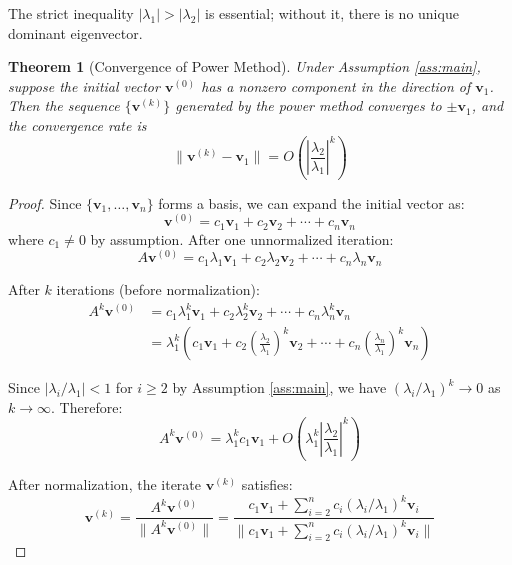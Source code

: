 \documentclass[11pt,a4paper]{article}
\newtheorem{theorem}{Theorem}
\begin{document}
The strict inequality $|\lambda_1| > |\lambda_2|$ is essential; without it, there is no unique dominant eigenvector.

\begin{theorem}[Convergence of Power Method]
\label{thm:convergence}
Under Assumption \ref{ass:main}, suppose the initial vector $\mathbf{v}^{(0)}$ has a nonzero component in the direction of $\mathbf{v}_1$. Then the sequence $\{\mathbf{v}^{(k)}\}$ generated by the power method converges to $\pm \mathbf{v}_1$, and the convergence rate is
\begin{equation}
\|\mathbf{v}^{(k)} - \mathbf{v}_1\| = O\left(\left|\frac{\lambda_2}{\lambda_1}\right|^k\right)
\end{equation}
\end{theorem}

\begin{proof}
Since $\{\mathbf{v}_1, \ldots, \mathbf{v}_n\}$ forms a basis, we can expand the initial vector as:
\begin{equation}
\mathbf{v}^{(0)} = c_1 \mathbf{v}_1 + c_2 \mathbf{v}_2 + \cdots + c_n \mathbf{v}_n
\end{equation}
where $c_1 \neq 0$ by assumption. After one unnormalized iteration:
\begin{equation}
A\mathbf{v}^{(0)} = c_1 \lambda_1 \mathbf{v}_1 + c_2 \lambda_2 \mathbf{v}_2 + \cdots + c_n \lambda_n \mathbf{v}_n
\end{equation}

After $k$ iterations (before normalization):
\begin{align}
A^k \mathbf{v}^{(0)} &= c_1 \lambda_1^k \mathbf{v}_1 + c_2 \lambda_2^k \mathbf{v}_2 + \cdots + c_n \lambda_n^k \mathbf{v}_n \\
&= \lambda_1^k \left(c_1 \mathbf{v}_1 + c_2 \left(\frac{\lambda_2}{\lambda_1}\right)^k \mathbf{v}_2 + \cdots + c_n \left(\frac{\lambda_n}{\lambda_1}\right)^k \mathbf{v}_n\right)
\end{align}

Since $|\lambda_i/\lambda_1| < 1$ for $i \geq 2$ by Assumption \ref{ass:main}, we have $(\lambda_i/\lambda_1)^k \to 0$ as $k \to \infty$. Therefore:
\begin{equation}
A^k \mathbf{v}^{(0)} = \lambda_1^k c_1 \mathbf{v}_1 + O\left(\lambda_1^k \left|\frac{\lambda_2}{\lambda_1}\right|^k\right)
\end{equation}

After normalization, the iterate $\mathbf{v}^{(k)}$ satisfies:
\begin{equation}
\mathbf{v}^{(k)} = \frac{A^k \mathbf{v}^{(0)}}{\|A^k \mathbf{v}^{(0)}\|} = \frac{c_1 \mathbf{v}_1 + \sum_{i=2}^n c_i (\lambda_i/\lambda_1)^k \mathbf{v}_i}{\|c_1 \mathbf{v}_1 + \sum_{i=2}^n c_i (\lambda_i/\lambda_1)^k \mathbf{v}_i\|}
\end{equation}


\end{proof}
\end{document}
